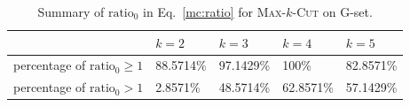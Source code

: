 \documentclass[12pt, a4paper]{article}%
\numberwithin{equation}{section}
\theoremstyle{plain}
\begin{document}
				
				\begin{table}[htbp]
					\centering
					\caption{Summary of $\text{ratio}_0$ in Eq.~\eqref{mc:ratio}  for \textsc{Max}-$k$-\textsc{Cut} on G-set.}
					\label{tab:mc-quality}
					\begin{tabular}{|l|l|l|l|l|}
						\hline
						& $k=2$     & $k=3$     & $k=4$     & $k=5$     \\ \hline
						percentage of $\text{ratio}_0\geq 1$         & 88.5714\%     & 97.1429\% & 100\%     & 82.8571\% \\ \hline
						percentage of $\text{ratio}_0>1$                 &2.8571\%&48.5714\% & 62.8571\% & 57.1429\%  \\ \hline
					\end{tabular}
				\end{table}
				
\end{document}
